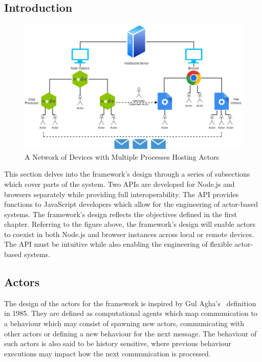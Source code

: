 \documentclass[12pt, a4paper]{report}
\theoremstyle{definition}
\theoremstyle{definition}%
\theoremstyle{definition}%
\theoremstyle{definition}%
\theoremstyle{definition}%
\theoremstyle{definition}%
\begin{document}
\subsection{Introduction}
\begin{figure}[H]
    \begin{centering}
        \includegraphics[width=\textwidth]{resources/network.png}
        \caption{A Network of Devices with Multiple Processes Hosting Actors}
    \end{centering}
\end{figure}
This section delves into the framework’s design through a series of subsections which cover parts of the system. Two APIs are developed for Node.js and browsers separately while providing full interoperability. The API provides functions to JavaScript developers which allow for the engineering of actor-based systems. The framework’s design reflects the objectives defined in the first chapter. Referring to the figure above, the framework’s design will enable actors to coexist in both Node.js and browser instances across local or remote devices. The API must be intuitive while also enabling the engineering of flexible actor-based systems.
\subsection{Actors}
The design of the actors for the framework is inspired by Gul Agha’s~\cite{agha1985actors} definition in 1985. They are defined as computational agents which map communication to a behaviour which may consist of spawning new actors, communicating with other actors or defining a new behaviour for the next message. The behaviour of such actors is also said to be history sensitive, where previous behaviour executions may impact how the next communication is processed.
\end{document}
